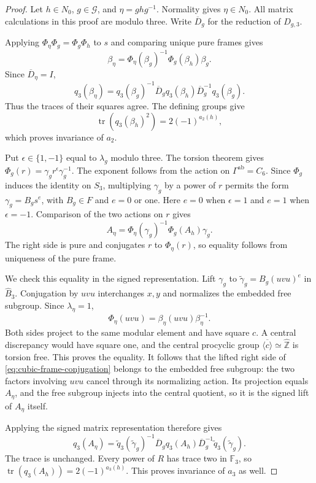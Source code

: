 \begin{proof}
Let $h\in N_0$, $g\in\mathcal G$, and $\eta=ghg^{-1}$.
Normality gives $\eta\in N_0$. All matrix calculations in this
proof are modulo three. Write $\overline D_g$ for the reduction
of $D_{g,3}$.

Applying $\Phi_\eta\Phi_g=\Phi_g\Phi_h$ to $s$ and comparing
unique pure frames gives
\[
 \beta_\eta=\Phi_\eta(\beta_g)^{-1}\Phi_g(\beta_h)\beta_g.
\]
Since $\overline D_\eta=I$,
\[
 q_3(\beta_\eta)=q_3(\beta_g)^{-1}\overline D_g
      q_3(\beta_h)\overline D_g^{-1}q_3(\beta_g).
\]
Thus the traces of their squares agree. The defining groups give
\[
 \operatorname{tr}(q_3(\beta_h)^2)=2(-1)^{a_2(h)},
\]
which proves invariance of $a_2$.

Put $\epsilon\in\{1,-1\}$ equal to $\lambda_g$ modulo three.
The torsion theorem gives
$\Phi_g(r)=\gamma_g r^\epsilon\gamma_g^{-1}$.
The exponent follows from the action on $\Gamma^{\mathrm{ab}}=C_6$.
Since $\Phi_g$ induces the identity on $S_3$, multiplying
$\gamma_g$ by a power of $r$ permits the form
$\gamma_g=B_gs^e$, with $B_g\in F$ and $e=0$ or one.
Here $e=0$ when $\epsilon=1$ and $e=1$ when $\epsilon=-1$.
Comparison of the two actions on $r$ gives
\begin{equation}
 A_\eta=\Phi_\eta(\gamma_g)^{-1}\Phi_g(A_h)\gamma_g.
 \label{eq:cubic-frame-conjugation}
\end{equation}
The right side is pure and conjugates $r$ to $\Phi_\eta(r)$,
so equality follows from uniqueness of the pure frame.

We check this equality in the signed representation. Lift
$\gamma_g$ to $\widetilde\gamma_g=B_g(uvu)^e$ in
$\widehat B_3$. Conjugation by $uvu$ interchanges $x,y$ and
normalizes the embedded free subgroup. Since $\lambda_\eta=1$,
\[
 \Phi_\eta(uvu)=\beta_\eta(uvu)\beta_\eta^{-1}.
\]
Both sides project to the same modular element and have square $c$.
A central discrepancy would have square one, and the central
procyclic group $\overline{\langle c\rangle}\simeq\widehat{\mathbb Z}$
is torsion free. This proves the equality.
It follows that the lifted right side of
\eqref{eq:cubic-frame-conjugation} belongs to the embedded free
subgroup: the two factors involving $uvu$ cancel through its
normalizing action. Its projection equals $A_\eta$, and the free
subgroup injects into the central quotient, so it is the signed
lift of $A_\eta$ itself.

Applying the signed matrix representation therefore gives
\[
 q_3(A_\eta)=
 \widetilde q_3(\widetilde\gamma_g)^{-1}\overline D_g
 q_3(A_h)\overline D_g^{-1}
 \widetilde q_3(\widetilde\gamma_g).
\]
The trace is unchanged. Every power of $R$ has trace two in
$\mathbb F_3$, so
$\operatorname{tr}(q_3(A_h))=2(-1)^{a_3(h)}$.
This proves invariance of $a_3$ as well.
\end{proof}

